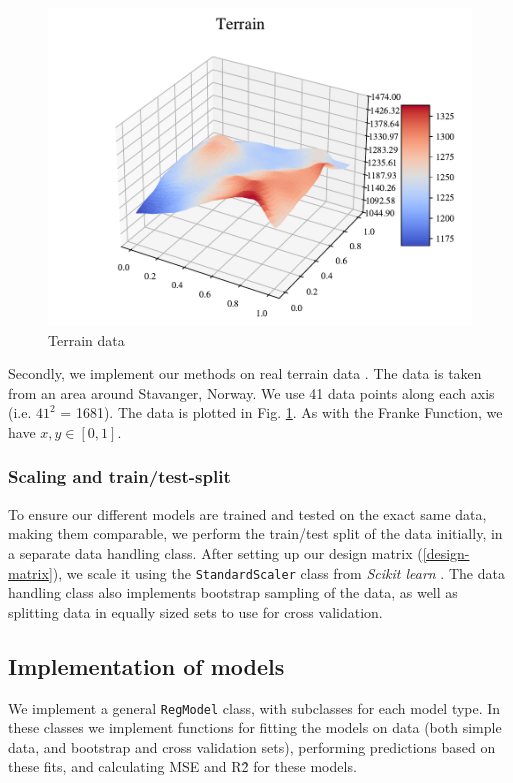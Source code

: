 \begin{figure}
    \centering
    \includegraphics[width=1\linewidth]{project_1/figures/figures_in_report/terrain.pdf}
    \caption{Terrain data}
    \label{data:terrain}
\end{figure}

Secondly, we implement our methods on real terrain data \cite{mortengithub}. The data is taken from an area around Stavanger, Norway. We use 41 data points along each axis (i.e. $41^2$ = 1681). The data is plotted in Fig. \ref{data:terrain}. As with the Franke Function, we have $x,y \in [0,1]$.

\subsubsection{Scaling and train/test-split}
To ensure our different models are trained and tested on the exact same data, making them comparable, we perform the train/test split of the data initially, in a separate data handling class.
After setting up our design matrix (\ref{design-matrix}), we scale it using the \texttt{StandardScaler} class from \textit{Scikit learn} \cite{sklearn}.
The data handling class also implements bootstrap sampling of the data, as well as splitting data in equally sized sets to use for cross validation.

\subsection{Implementation of models}
We implement a general \texttt{RegModel} class, with subclasses for each model type.
In these classes we implement functions for fitting the models on data (both simple data, and bootstrap and cross validation sets), performing predictions based on these fits, and calculating MSE and R\^2 for these models.

